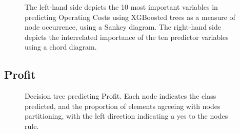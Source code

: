 \documentclass[review,12pt,authoryear]{elsarticle}
\begin{document}
\begin{linenumbers}
\begin{figure}
  \caption{The left-hand side depicts the 10 most important variables in predicting Operating Costs using XGBoosted trees as a measure of node occurrence, using a Sankey diagram. The right-hand side depicts the interrelated importance of the ten predictor variables using a chord diagram.}\label{fig:operating_costs_sankey}
\end{figure}

\subsection{Profit}

\begin{figure}
  \caption{Decision tree predicting Profit. Each node indicates the class predicted, and the proportion of elements agreeing with nodes partitioning, with the left direction indicating a yes to the nodes rule.}\label{fig:profit_tree}
\end{figure}


\end{linenumbers}
\end{document}
